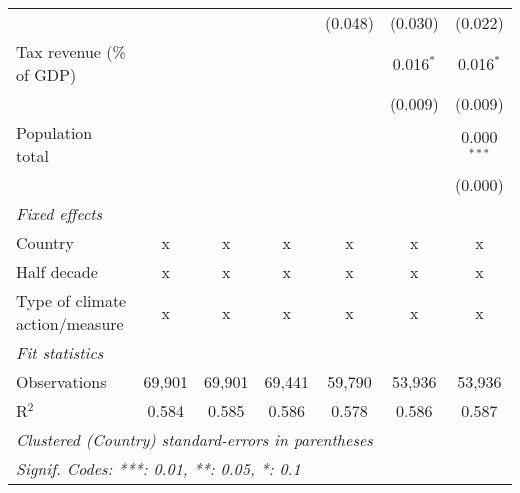 \begin{tabular}{lcccccc}
                                                   &             &                &                & (0.048)        & (0.030)        & (0.022)\\   
   Tax revenue (\% of GDP)                         &             &                &                &                & 0.016$^{*}$    & 0.016$^{*}$\\   
                                                   &             &                &                &                & (0.009)        & (0.009)\\   
   Population total                                &             &                &                &                &                & 0.000$^{***}$\\   
                                                   &             &                &                &                &                & (0.000)\\   
   \emph{Fixed effects}\\
   Country                                         & x           & x              & x              & x              & x              & x\\  
   Half decade                                     & x           & x              & x              & x              & x              & x\\  
   Type of climate action/measure                  & x           & x              & x              & x              & x              & x\\  
   \midrule \emph{Fit statistics}\\
   Observations                                    & 69,901      & 69,901         & 69,441         & 59,790         & 53,936         & 53,936\\  
   R$^2$                                           & 0.584       & 0.585          & 0.586          & 0.578          & 0.586          & 0.587\\  
   \midrule
   \multicolumn{7}{l}{\emph{Clustered (Country) standard-errors in parentheses}}\\
   \multicolumn{7}{l}{\emph{Signif. Codes: ***: 0.01, **: 0.05, *: 0.1}}\\
\end{tabular}
\par\endgroup


